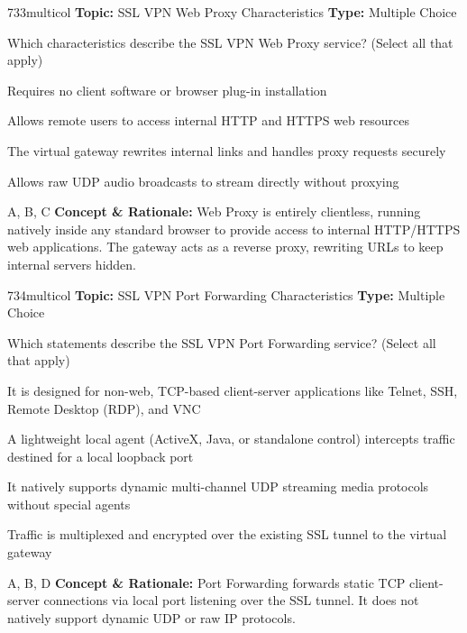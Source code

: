 \begin{qcard}{733}{multicol}
\textcolor{darkslate!75}{\small\textbf{Topic:} SSL VPN Web Proxy Characteristics \hfill \textbf{Type:} Multiple Choice}\vspace{0.4em}\par
Which characteristics describe the SSL VPN Web Proxy service? (Select all that apply)
\begin{qoptions}
\item Requires no client software or browser plug-in installation
\item Allows remote users to access internal HTTP and HTTPS web resources
\item The virtual gateway rewrites internal links and handles proxy requests securely
\item Allows raw UDP audio broadcasts to stream directly without proxying
\end{qoptions}
\end{qcard}
\nopagebreak
\begin{explainbox}{A, B, C}
\textbf{Concept \& Rationale:} Web Proxy is entirely clientless, running natively inside any standard browser to provide access to internal HTTP/HTTPS web applications. The gateway acts as a reverse proxy, rewriting URLs to keep internal servers hidden.
\end{explainbox}

\begin{qcard}{734}{multicol}
\textcolor{darkslate!75}{\small\textbf{Topic:} SSL VPN Port Forwarding Characteristics \hfill \textbf{Type:} Multiple Choice}\vspace{0.4em}\par
Which statements describe the SSL VPN Port Forwarding service? (Select all that apply)
\begin{qoptions}
\item It is designed for non-web, TCP-based client-server applications like Telnet, SSH, Remote Desktop (RDP), and VNC
\item A lightweight local agent (ActiveX, Java, or standalone control) intercepts traffic destined for a local loopback port
\item It natively supports dynamic multi-channel UDP streaming media protocols without special agents
\item Traffic is multiplexed and encrypted over the existing SSL tunnel to the virtual gateway
\end{qoptions}
\end{qcard}
\nopagebreak
\begin{explainbox}{A, B, D}
\textbf{Concept \& Rationale:} Port Forwarding forwards static TCP client-server connections via local port listening over the SSL tunnel. It does not natively support dynamic UDP or raw IP protocols.
\end{explainbox}

